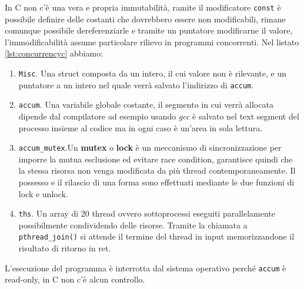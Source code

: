 \documentclass[Lau,binding=0.6cm]{sapthesis}
\begin{document}
In C non c'è una vera e propria immutabilità, ramite il modificatore \colorbox{backcolour}{\texttt{const}} è possibile definire delle costanti che dovrebbero essere non modificabili, rimane comunque possibile dereferenziarle e tramite un puntatore modificarne il valore, l'immodificabilità assume particolare rilievo in programmi concorrenti. Nel listato \ref{lst:concurrencyc} abbiamo:
\begin{enumerate}
    \item \colorbox{backcolour}{\texttt{Misc}}. Una struct composta da un intero, il cui valore non è rilevante, e un puntatore a un intero nel quale verrà salvato l'indirizzo di \colorbox{backcolour}{\texttt{accum}}. 
    \item \colorbox{backcolour}{\texttt{accum}}. Una variabile globale costante, il segmento in cui verrà allocata dipende dal compilatore ad esempio usando \textit{gcc} è salvato nel text segment del processo insieme al codice ma in ogni caso è un'area in sola lettura.
    \item \colorbox{backcolour}{\texttt{accum\_mutex}}.Un \textbf{mutex} o \textbf{lock} è un meccanismo di sincronizzazione per imporre la mutua esclusione ed evitare race condition, garantisce quindi che la stessa risorsa non venga modificata da più thread contemporaneamente. Il possesso e il rilascio di una forma sono effettuati mediante le due funzioni di lock e unlock.
    \item \colorbox{backcolour}{\texttt{ths}}. Un array di 20 thread ovvero sottoprocessi eseguiti parallelamente possibilmente condividendo delle risorse. Tramite la chiamata a \colorbox{backcolour}{\texttt{pthread\_join()}} si attende il termine del thread in input memorizzandone il risultato di ritorno in \colorbox{backcolour}{ret}. 
\end{enumerate}

L'esecuzione del programma è interrotta dal sistema operativo perché \colorbox{backcolour}{\texttt{accum}} è read-only, in C non c'è alcun controllo.



\end{document}
